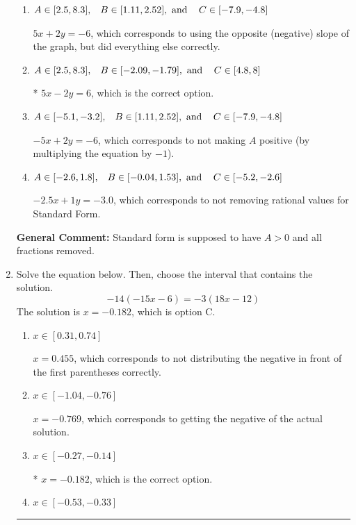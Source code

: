 \documentclass{extbook}[14pt]
\newcommand{\litem}[1]{\item #1

\rule{\textwidth}{0.4pt}}
\begin{document}
\begin{enumerate}
{\begin{enumerate}[label=\Alph*.]
 $-2.5x - 1y = 3.0$, which corresponds to using the opposite (negative) slope of the graph and not removing rational values.
\item \( A \in [2.5, 8.3], \hspace{3mm} B \in [1.11, 2.52], \text{ and } \hspace{3mm} C \in [-7.9, -4.8] \)

 $5x + 2y = -6$, which corresponds to using the opposite (negative) slope of the graph, but did everything else correctly.
\item \( A \in [2.5, 8.3], \hspace{3mm} B \in [-2.09, -1.79], \text{ and } \hspace{3mm} C \in [4.8, 8] \)

* $5x - 2y = 6$, which is the correct option.
\item \( A \in [-5.1, -3.2], \hspace{3mm} B \in [1.11, 2.52], \text{ and } \hspace{3mm} C \in [-7.9, -4.8] \)

 $-5x + 2y = -6$, which corresponds to not making $A$ positive (by multiplying the equation by $-1$).
\item \( A \in [-2.6, 1.8], \hspace{3mm} B \in [-0.04, 1.53], \text{ and } \hspace{3mm} C \in [-5.2, -2.6] \)

 $-2.5x + 1y = -3.0$, which corresponds to not removing rational values for Standard Form.
\end{enumerate}

\textbf{General Comment:} Standard form is supposed to have $A > 0$ and all fractions removed.
}
\litem{
Solve the equation below. Then, choose the interval that contains the solution.
\[ -14(-15x -6) = -3(18x -12) \]The solution is \( x = -0.182 \), which is option C.\begin{enumerate}[label=\Alph*.]
\item \( x \in [0.31, 0.74] \)

$x = 0.455$, which corresponds to not distributing the negative in front of the first parentheses correctly.
\item \( x \in [-1.04, -0.76] \)

$x = -0.769$, which corresponds to getting the negative of the actual solution.
\item \( x \in [-0.27, -0.14] \)

* $x = -0.182$, which is the correct option.
\item \( x \in [-0.53, -0.33] \)


\end{enumerate}}
\end{enumerate}
\end{document}
